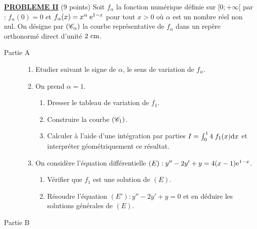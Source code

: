 \noindent \underline{\textsc{\textbf{PROBLEME II}}} (9 points) \newline
      Soit $f_\alpha$ la fonction num\'erique d\'efinie sur $[0;+\infty[$ par : 
      $f_\alpha (0) = 0$ et $f_\alpha (x) = x^\alpha \; \mathrm{e}^{1-x}$ pour tout $x > 0$ o\`u $\alpha$ est un nombre r\'eel non nul.
      On d\'esigne par $(\mathscr{C}_\alpha)$ la courbe repr\'esentative de $f_\alpha$ dans un rep\`ere orthonorm\'e direct \Oij{}
      d'unit\'e $2~\mathrm{cm}$.
      \begin{description}
            \item[Partie A]
                  \begin{enumerate}
                        \item Etudier suivant le signe de $\alpha$, le sens de variation de $f_\alpha$.
                        \item On prend $\alpha = 1$.
                              \begin{enumerate}
                                    \item Dresser le tableau de variation de $f_1$.
                                    \item Construire la courbe $(\mathscr{C}_1)$.
                                    \item Calculer \`a l'aide d'une int\'egration par parties 
                                          $I = \int_{0}^{1} 4\; f_1 (x) \mathrm{d}x$ et interpr\'eter g\'eom\'etriquement ce r\'esultat.
                              \end{enumerate}
                        \item On consid\`ere l'\'equation diff\'erentielle $(E) : y'' - 2 y' + y = 4 (x-1) \mathrm{e}^{1-x}$.
                              \begin{enumerate}
                                    \item V\'erifier que $f_1$ est une solution de $(E)$.
                                    \item R\'esoudre l'\'equation $(E') : y'' - 2 y' + y = 0$ et 
                                          en d\'eduire les solutions g\'en\'erales de $(E)$.
                              \end{enumerate}
                  \end{enumerate}
            \item[Partie B]~\newline

\end{description}
